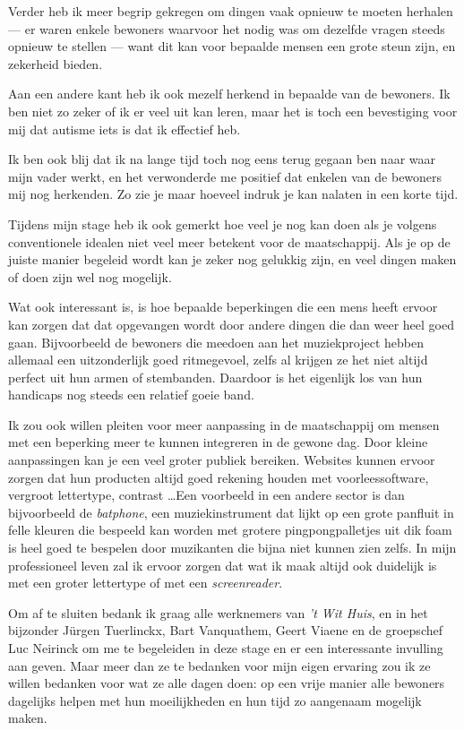 \documentclass[a4paper,12pt]{article}
\begin{document}
Verder heb ik meer begrip gekregen om dingen vaak opnieuw te moeten herhalen --- er waren enkele bewoners waarvoor het nodig was om dezelfde vragen steeds opnieuw te stellen --- want dit kan voor bepaalde mensen een grote steun zijn, en zekerheid bieden.

Aan een andere kant heb ik ook mezelf herkend in bepaalde van de bewoners. Ik ben niet zo zeker of ik er veel uit kan leren, maar het is toch een bevestiging voor mij dat autisme iets is dat ik effectief heb.

Ik ben ook blij dat ik na lange tijd toch nog eens terug gegaan ben naar waar mijn vader werkt, en het verwonderde me positief dat enkelen van de bewoners mij nog herkenden. Zo zie je maar hoeveel indruk je kan nalaten in een korte tijd.

Tijdens mijn stage heb ik ook gemerkt hoe veel je nog kan doen als je volgens conventionele idealen niet veel meer betekent voor de maatschappij. Als je op de juiste manier begeleid wordt kan je zeker nog gelukkig zijn, en veel dingen maken of doen zijn wel nog mogelijk.

Wat ook interessant is, is hoe bepaalde beperkingen die een mens heeft ervoor kan zorgen dat dat opgevangen wordt door andere dingen die dan weer heel goed gaan. Bijvoorbeeld de bewoners die meedoen aan het muziekproject hebben allemaal een uitzonderlijk goed ritmegevoel, zelfs al krijgen ze het niet altijd perfect uit hun armen of stembanden. Daardoor is het eigenlijk los van hun handicaps nog steeds een relatief goeie band.

Ik zou ook willen pleiten voor meer aanpassing in de maatschappij om mensen met een beperking meer te kunnen integreren in de gewone dag. Door kleine aanpassingen kan je een veel groter publiek bereiken. Websites kunnen ervoor zorgen dat hun producten altijd goed rekening houden met voorleessoftware, vergroot lettertype, contrast \dots Een voorbeeld in een andere sector is dan bijvoorbeeld de \emph{batphone}, een muziekinstrument dat lijkt op een grote panfluit in felle kleuren die bespeeld kan worden met grotere pingpongpalletjes uit dik foam is heel goed te bespelen door muzikanten die bijna niet kunnen zien zelfs. In mijn professioneel leven zal ik ervoor zorgen dat wat ik maak altijd ook duidelijk is met een groter lettertype of met een \emph{screenreader}.

Om af te sluiten bedank ik graag alle werknemers van \emph{'t Wit Huis}, en in het bijzonder Jürgen Tuerlinckx, Bart Vanquathem, Geert Viaene en de groepschef Luc Neirinck om me te begeleiden in deze stage en er een interessante invulling aan geven. Maar meer dan ze te bedanken voor mijn eigen ervaring zou ik ze willen bedanken voor wat ze alle dagen doen: op een vrije manier alle bewoners dagelijks helpen met hun moeilijkheden en hun tijd zo aangenaam mogelijk maken.
\end{document}
